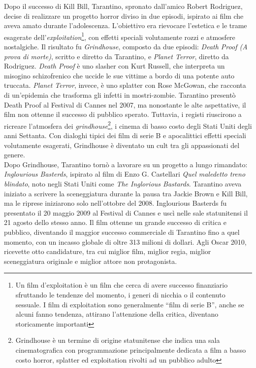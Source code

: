 \documentclass[12pt]{article} %
\begin{document}
\begin{flushleft}
    Dopo il successo di Kill Bill, Tarantino, spronato dall’amico Robert Rodriguez, decise di realizzare un progetto horror diviso in due episodi, ispirato ai film che aveva amato durante l’adolescenza. L’obiettivo era rievocare l’estetica e le trame esagerate dell’\textit{exploitation}\footnote{Un film d'exploitation è un film che cerca di avere successo finanziario sfruttando le tendenze del momento, i generi di nicchia o il contenuto sessuale. I film di exploitation sono generalmente “film di serie B”, anche se alcuni fanno tendenza, attirano l'attenzione della critica, diventano storicamente importanti}, con effetti speciali volutamente rozzi e atmosfere nostalgiche. 
    Il risultato fu \textit{Grindhouse}, composto da due episodi: \textit{Death Proof (A prova di morte)}, scritto e diretto da Tarantino, e \textit{Planet Terror}, diretto da Rodriguez.
    \textit{Death Proof} è uno slasher con Kurt Russell, che interpreta un misogino schizofrenico che uccide le sue vittime a bordo di una potente auto truccata. 
    \textit{Planet Terror}, invece, è uno splatter con Rose McGowan, che racconta di un’epidemia che trasforma gli infetti in mostri-zombie. 
    Tarantino presentò Death Proof al Festival di Cannes nel 2007, ma nonostante le alte aspettative, il film non ottenne il successo di pubblico sperato. 
    Tuttavia, i registi riuscirono a ricreare l’atmosfera dei \textit{grindhouse}\footnote{Grindhouse è un termine di origine statunitense che indica una sala cinematografica con programmazione principalmente dedicata a film a basso costo horror, splatter ed exploitation rivolti ad un pubblico adulto}, i cinema di basso costo degli Stati Uniti degli anni Settanta. Con dialoghi tipici dei film di serie B e apocalittici effetti speciali volutamente esagerati, Grindhouse è diventato un cult tra gli appassionati del genere. \\\vspace{1cm}
    Dopo Grindhouse, Tarantino tornò a lavorare su un progetto a lungo rimandato: \textit{Inglourious Basterds}, ispirato al film di Enzo G. Castellari \textit{Quel maledetto treno blindato}, noto negli Stati Uniti come \textit{The Inglorious Bastards}. 
    Tarantino aveva iniziato a scrivere la sceneggiatura durante la pausa tra Jackie Brown e Kill Bill, ma le riprese iniziarono solo nell'ottobre del 2008.
    Inglourious Basterds fu presentato il 20 maggio 2009 al Festival di Cannes e uscì nelle sale statunitensi il 21 agosto dello stesso anno.
    Il film ottenne un grande successo di critica e pubblico, diventando il maggior successo commerciale di Tarantino fino a quel momento, con un incasso globale di oltre 313 milioni di dollari. 
    Agli Oscar 2010, ricevette otto candidature, tra cui miglior film, miglior regia, miglior sceneggiatura originale e miglior attore non protagonista.







\end{flushleft}
\break
\end{document}
